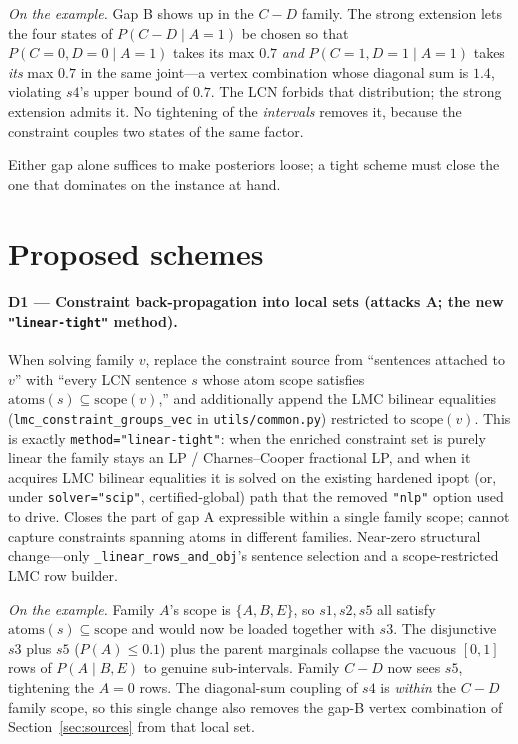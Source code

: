 \documentclass[11pt]{article}
\begin{document}
\smallskip\noindent\emph{On the example.} Gap B shows up in the $C\!-\!D$ family. The
strong extension lets the four states of $P(C\!-\!D\mid A{=}1)$ be chosen so that
$P(C{=}0,D{=}0\mid A{=}1)$ takes its max $0.7$ \emph{and} $P(C{=}1,D{=}1\mid A{=}1)$ takes
\emph{its} max $0.7$ in the same joint---a vertex combination whose diagonal sum is $1.4$,
violating $s4$'s upper bound of $0.7$. The LCN forbids that distribution; the strong
extension admits it. No tightening of the \emph{intervals} removes it, because the
constraint couples two states of the same factor.

\smallskip
Either gap alone suffices to make posteriors loose; a tight scheme must close the one that
dominates on the instance at hand.

\section{Proposed schemes}\label{sec:designs}

\paragraph{D1 --- Constraint back-propagation into local sets (attacks A; the new \texttt{"linear-tight"} method).}
When solving family $v$, replace the constraint source from ``sentences attached to $v$''
with ``every LCN sentence $s$ whose atom scope satisfies $\mathrm{atoms}(s)\subseteq
\mathrm{scope}(v)$,'' and additionally append the LMC bilinear equalities
(\texttt{lmc\_constraint\_groups\_vec} in \texttt{utils/common.py}) restricted to
$\mathrm{scope}(v)$. This is exactly \texttt{method="linear-tight"}: when the enriched
constraint set is purely linear the family stays an LP / Charnes--Cooper fractional LP,
and when it acquires LMC bilinear equalities it is solved on the existing hardened ipopt
(or, under \texttt{solver="scip"}, certified-global) path that the removed \texttt{"nlp"}
option used to drive. Closes the part of gap A expressible within a single family scope;
cannot capture constraints spanning atoms in different families. Near-zero structural
change---only \texttt{\_linear\_rows\_and\_obj}'s sentence selection and a scope-restricted
LMC row builder.

\smallskip\noindent\emph{On the example.} Family $A$'s scope is $\{A,B,E\}$, so $s1,s2,s5$
all satisfy $\mathrm{atoms}(s)\subseteq\mathrm{scope}$ and would now be loaded together with
$s3$. The disjunctive $s3$ plus $s5$ ($P(A)\le0.1$) plus the parent marginals collapse the
vacuous $[0,1]$ rows of $P(A\mid B,E)$ to genuine sub-intervals. Family $C\!-\!D$ now sees
$s5$, tightening the $A{=}0$ rows. The diagonal-sum coupling of $s4$ is \emph{within} the
$C\!-\!D$ family scope, so this single change also removes the gap-B vertex combination of
Section~\ref{sec:sources} from that local set.
\end{document}
